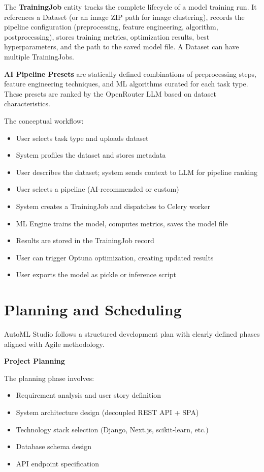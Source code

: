 \documentclass[12pt,a4paper]{report}
\begin{document}
The \textbf{TrainingJob} entity tracks the complete lifecycle of a model training run. It references a Dataset (or an image ZIP path for image clustering), records the pipeline configuration (preprocessing, feature engineering, algorithm, postprocessing), stores training metrics, optimization results, best hyperparameters, and the path to the saved model file. A Dataset can have multiple TrainingJobs.

\textbf{AI Pipeline Presets} are statically defined combinations of preprocessing steps, feature engineering techniques, and ML algorithms curated for each task type. These presets are ranked by the OpenRouter LLM based on dataset characteristics.

The conceptual workflow:
\begin{itemize}
\item User selects task type and uploads dataset
\item System profiles the dataset and stores metadata
\item User describes the dataset; system sends context to LLM for pipeline ranking
\item User selects a pipeline (AI-recommended or custom)
\item System creates a TrainingJob and dispatches to Celery worker
\item ML Engine trains the model, computes metrics, saves the model file
\item Results are stored in the TrainingJob record
\item User can trigger Optuna optimization, creating updated results
\item User exports the model as pickle or inference script
\end{itemize}

\section{Planning and Scheduling}
AutoML Studio follows a structured development plan with clearly defined phases aligned with Agile methodology.

\textbf{Project Planning}

The planning phase involves:
\begin{itemize}
\item Requirement analysis and user story definition
\item System architecture design (decoupled REST API + SPA)
\item Technology stack selection (Django, Next.js, scikit-learn, etc.)
\item Database schema design
\item API endpoint specification
\end{itemize}
\end{document}
